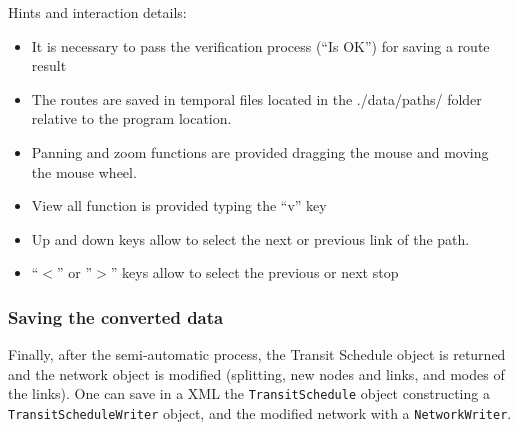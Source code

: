 Hints and interaction details:
\begin{itemize}
	\item It is necessary to pass the verification process (“Is OK”) for saving a route result
	\item The routes are saved in temporal files located in the ./data/paths/ folder relative to the program location.
	\item Panning and zoom functions are provided dragging the mouse and moving the mouse wheel.
	\item View all function is provided typing the “v” key
	\item Up and down keys allow to select the next or previous link of the path.
	\item “$<$” or ”$>$” keys allow to select the previous or next stop 


\end{itemize}

\subsubsection{Saving the converted data}

Finally, after the semi-automatic process, the Transit Schedule  object is returned and the network object is modified (splitting, new  nodes and links, and modes of the links). One can save in a XML  the 
\texttt{TransitSchedule} object constructing a 
\texttt{TransitScheduleWriter} object, and the modified network with a 
\texttt{NetworkWriter}.

